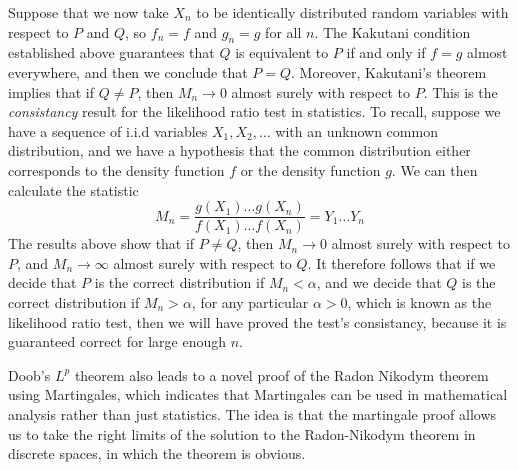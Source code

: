 \begin{example}
Suppose that we now take $X_n$ to be identically distributed random variables with respect to $P$ and $Q$, so $f_n = f$ and $g_n = g$ for all $n$. The Kakutani condition established above guarantees that $Q$ is equivalent to $P$ if and only if $f = g$ almost everywhere, and then we conclude that $P = Q$. Moreover, Kakutani's theorem implies that if $Q \neq P$, then $M_n \to 0$ almost surely with respect to $P$. This is the {\it consistancy} result for the likelihood ratio test in statistics. To recall, suppose we have a sequence of i.i.d variables $X_1, X_2, \dots$  with an unknown common distribution, and we have a hypothesis that the common distribution either corresponds to the density function $f$ or the density function $g$. We can then calculate the statistic
%
\[ M_n = \frac{g(X_1) \dots g(X_n)}{f(X_1) \dots f(X_n)} = Y_1 \dots Y_n \]
%
The results above show that if $P \neq Q$, then $M_n \to 0$ almost surely with respect to $P$, and $M_n \to \infty$ almost surely with respect to $Q$. It therefore follows that if we decide that $P$ is the correct distribution if $M_n < \alpha$, and we decide that $Q$ is the correct distribution if $M_n > \alpha$, for any particular $\alpha > 0$, which is known as the likelihood ratio test, then we will have proved the test's consistancy, because it is guaranteed correct for large enough $n$.
\end{example}

Doob's $L^p$ theorem also leads to a novel proof of the Radon Nikodym theorem using Martingales, which indicates that Martingales can be used in mathematical analysis rather than just statistics. The idea is that the martingale proof allows us to take the right limits of the solution to the Radon-Nikodym theorem in discrete spaces, in which the theorem is obvious.

